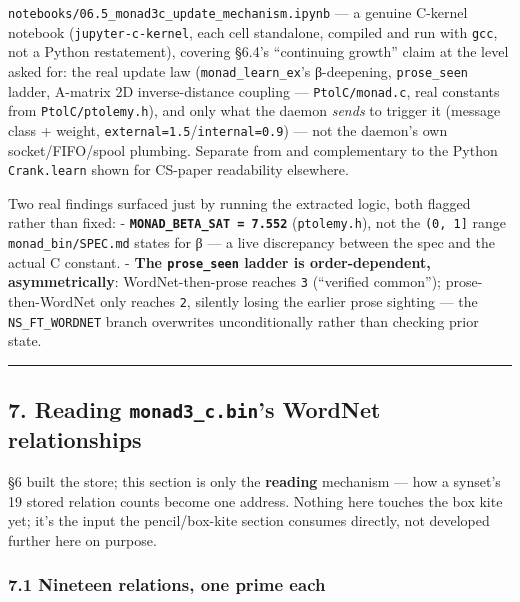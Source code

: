 \documentclass[
  10pt,
]{article}
\begin{document}
\texttt{notebooks/06.5\_monad3c\_update\_mechanism.ipynb} --- a genuine
C-kernel notebook (\texttt{jupyter-c-kernel}, each cell standalone,
compiled and run with \texttt{gcc}, not a Python restatement), covering
§6.4's ``continuing growth'' claim at the level asked for: the real
update law (\texttt{monad\_learn\_ex}'s β-deepening,
\texttt{prose\_seen} ladder, A-matrix 2D inverse-distance coupling ---
\texttt{PtolC/monad.c}, real constants from \texttt{PtolC/ptolemy.h}),
and only what the daemon \emph{sends} to trigger it (message class +
weight, \texttt{external=1.5}/\texttt{internal=0.9}) --- not the
daemon's own socket/FIFO/spool plumbing. Separate from and complementary
to the Python \texttt{Crank.learn} shown for CS-paper readability
elsewhere.

Two real findings surfaced just by running the extracted logic, both
flagged rather than fixed: -
\textbf{\texttt{MONAD\_BETA\_SAT\ =\ 7.552}} (\texttt{ptolemy.h}), not
the \texttt{(0,\ 1{]}} range \texttt{monad\_bin/SPEC.md} states for β
--- a live discrepancy between the spec and the actual C constant. -
\textbf{The \texttt{prose\_seen} ladder is order-dependent,
asymmetrically}: WordNet-then-prose reaches \texttt{3} (``verified
common''); prose-then-WordNet only reaches \texttt{2}, silently losing
the earlier prose sighting --- the \texttt{NS\_FT\_WORDNET} branch
overwrites unconditionally rather than checking prior state.

\begin{center}\rule{0.5\linewidth}{0.5pt}\end{center}

\hypertarget{reading-monad3_c.bins-wordnet-relationships}{%
\subsection{\texorpdfstring{7. Reading \texttt{monad3\_c.bin}'s WordNet
relationships}{7. Reading monad3\_c.bin's WordNet relationships}}\label{reading-monad3_c.bins-wordnet-relationships}}

§6 built the store; this section is only the \textbf{reading} mechanism
--- how a synset's 19 stored relation counts become one address. Nothing
here touches the box kite yet; it's the input the pencil/box-kite
section consumes directly, not developed further here on purpose.

\hypertarget{nineteen-relations-one-prime-each}{%
\subsubsection{7.1 Nineteen relations, one prime
each}\label{nineteen-relations-one-prime-each}}
\end{document}
